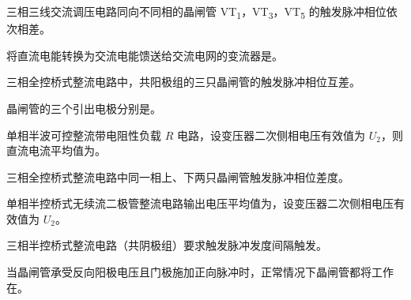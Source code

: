 \documentclass[电力电子]{subfiles}
\begin{document}
\begin{ti}
	三相三线交流调压电路同向不同相的晶闸管 VT\textsubscript{1}，VT\textsubscript{3}，VT\textsubscript{5} 的触发脉冲相位依次相差。
\end{ti}

\begin{ti}
	将直流电能转换为交流电能馈送给交流电网的变流器是。
\end{ti}

\begin{ti}
	三相全控桥式整流电路中，共阳极组的三只晶闸管的触发脉冲相位互差。
\end{ti}

\begin{ti}
	晶闸管的三个引出电极分别是。
\end{ti}

\begin{ti}
	单相半波可控整流带电阻性负载 $R$ 电路，设变压器二次侧相电压有效值为 $U_{2}$，则直流电流平均值为。
\end{ti}

\begin{ti}
	三相全控桥式整流电路中同一相上、下两只晶闸管触发脉冲相位差度。
\end{ti}

\begin{ti}
	单相半控桥式无续流二极管整流电路输出电压平均值为，设变压器二次侧相电压有效值为 $U_{2}$。
\end{ti}

\begin{ti}
	三相半控桥式整流电路（共阴极组）要求触发脉冲发度间隔触发。
\end{ti}

\begin{ti}
	当晶闸管承受反向阳极电压且门极施加正向脉冲时，正常情况下晶闸管都将工作在。
\end{ti}
\end{document}
